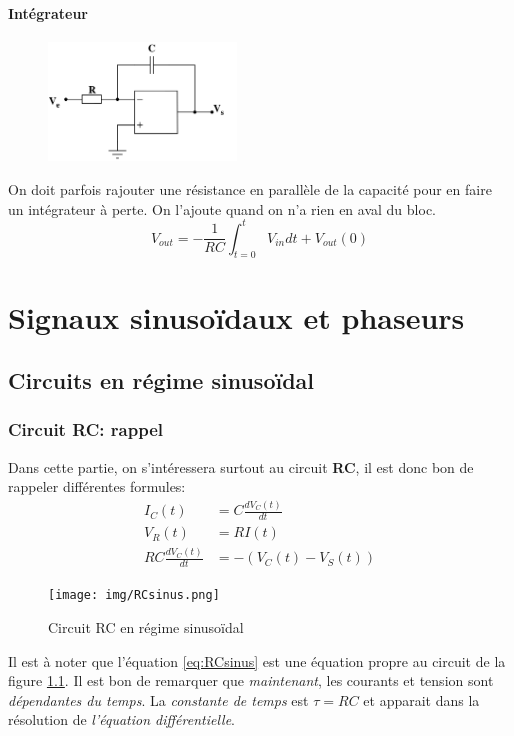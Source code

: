 \documentclass{report}
\begin{document}
\subsubsection{Intégrateur}
\begin{figure}[H]
\centering
\includegraphics[width=5cm]{img/800px-Aopintegrating.svg.png}
\end{figure}
On doit parfois rajouter une résistance en parallèle de la capacité pour en faire un intégrateur à perte. On l'ajoute quand on n'a rien en aval du bloc.
\begin{equation}
V_{out} = - \frac{1}{RC} \int_{t = 0}^{t} V_{in} dt + V_{out} (0)
\end{equation}


\chapter{Signaux sinusoïdaux et phaseurs}
\section{Circuits en régime sinusoïdal}

\subsection{Circuit RC: rappel}
Dans cette partie, on s'intéressera surtout au circuit \textbf{RC}, il est donc bon de rappeler différentes formules:
\begin{align}
I_C(t) &= C \frac{dV_C(t)}{dt}\\
V_R(t) &= RI(t)\\
RC \frac{dV_C(t)}{dt} &= -(V_C(t)-V_S(t))\label{eq:RCsinus}
\end{align}

\begin{figure}[H]
\centering
\texttt{[image: img/RCsinus.png]} \label{img:RCsinus}
\caption{Circuit RC en régime sinusoïdal}
\end{figure}

Il est à noter que l'équation \ref{eq:RCsinus} est une équation propre au circuit de la figure \ref{img:RCsinus}. Il est bon de remarquer que \textit{maintenant}, les courants et tension sont \textit{dépendantes du temps}. La \textit{constante de temps} est $\tau = RC$ et apparait dans la résolution de \textit{l'équation différentielle}.
\end{document}
